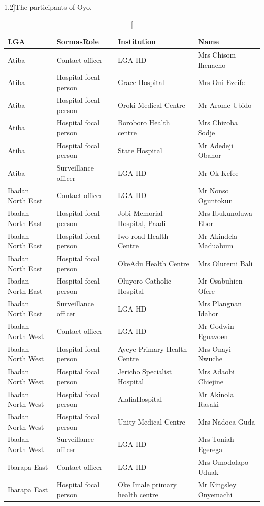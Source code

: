 \documentclass[a4paper, titlepage]{tufte-handout}
\begin{document}
\begin{table}\footnotesize
\caption[The participants of Oyo.][1.2\baselineskip]{The participants of Oyo.}\label{tab:user-oyo}
\begin{tabular}{l|l|l|l}
\toprule
LGA & SormasRole & Institution & Name\\
\midrule
Atiba & Contact officer & LGA HD & Mrs Chisom Ihenacho\\
Atiba & Hospital focal person & Grace Hospital & Mrs Oni Ezeife\\
Atiba & Hospital focal person & Oroki Medical Centre & Mr Arome Ubido\\
Atiba & Hospital focal person & Boroboro Health centre & Mrs Chizoba Sodje\\
Atiba & Hospital focal person & State Hospital & Mr Adedeji Obanor\\
Atiba & Surveillance officer & LGA HD & Mr Ok Kefee\\
Ibadan North East & Contact officer & LGA HD & Mr Nonso Oguntokun\\
Ibadan North East & Hospital focal person & Jobi Memorial Hospital, Paadi & Mrs Ibukunoluwa Ebor\\
Ibadan North East & Hospital focal person & Iwo road Health Centre & Mr Akindela Maduabum\\
Ibadan North East & Hospital focal person & OkeAdu Health Centre & Mrs Oluremi Bali\\
Ibadan North East & Hospital focal person & Oluyoro Catholic Hospital & Mr Osabuhien Ofere\\
Ibadan North East & Surveillance officer & LGA HD & Mrs Plangnan Idahor\\
Ibadan North West & Contact officer & LGA HD & Mr Godwin  Eguavoen\\
Ibadan North West & Hospital focal person & Ayeye Primary Health Centre & Mrs Onayi Nwuche\\
Ibadan North West & Hospital focal person & Jericho Specialist Hospital & Mrs Adaobi Chiejine\\
Ibadan North West & Hospital focal person & AlafiaHospital & Mr Akinola Rasaki\\
Ibadan North West & Hospital focal person & Unity Medical Centre & Mrs Nadoca Guda\\
Ibadan North West & Surveillance officer & LGA HD & Mrs Toniah Egerega\\
Ibarapa East & Contact officer & LGA HD & Mrs Omodolapo Uduak\\
Ibarapa East & Hospital focal person & Oke Imale primary health centre & Mr Kingsley  Onyemachi\\

\end{tabular}
\end{table}
\end{document}
